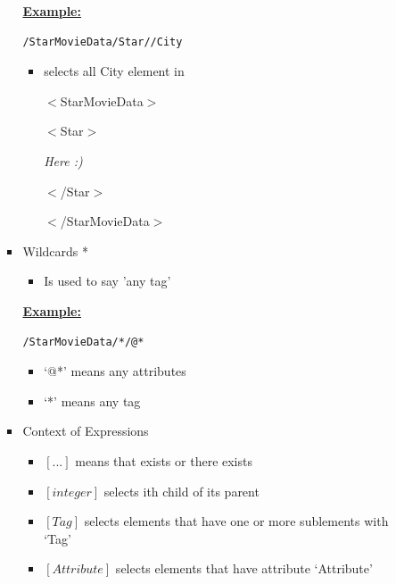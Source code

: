 \documentclass[12pt]{article}
\begin{document}
\begin{enumerate}[1.]
\begin{enumerate}[a)]
\begin{itemize}
            \bigskip

            \underline{\textbf{Example:}}

    \begin{lstlisting}[language=XML]
    /StarMovieData/Star//City
    \end{lstlisting}

            \bigskip

            \begin{itemize}
                \item selects all City element in

                \bigskip

                $<$StarMovieData$>$

                \quad$<$Star$>$

                \quad\quad\textit{Here :)}

                \quad$<$/Star$>$

                $<$/StarMovieData$>$
            \end{itemize}

            \item Wildcards *
            \begin{itemize}
                \item Is used to say 'any tag'
            \end{itemize}

            \bigskip

            \underline{\textbf{Example:}}

            \bigskip

    \begin{lstlisting}[language=XML]
    /StarMovieData/*/@*
    \end{lstlisting}

            \bigskip

            \begin{itemize}
                \item `@*' means any attributes
                \item `*' means any tag
            \end{itemize}
            \item Context of Expressions
            \begin{itemize}
                \item $[...]$ means that exists or there exists
                \item $[\textit{integer}]$ selects ith child of its parent
                \item $[\textit{Tag}]$ selects elements that have one or more sublements with `Tag'
                \item$[\textit{Attribute}]$ selects elements that have attribute `Attribute'


\end{itemize}
\end{itemize}
\end{enumerate}
\end{enumerate}
\end{document}
